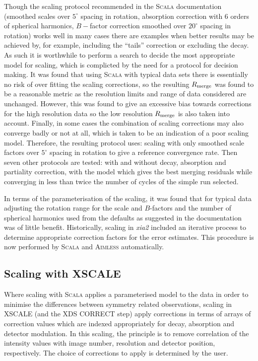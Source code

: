 \documentclass[preprint,pdf]{iucr}
\begin{document}
Though the scaling protocol recommended in the \textsc{Scala} documentation
(smoothed scales over $5^{\circ}$ spacing in rotation, absorption
correction with 6 orders of spherical harmonics, $B-$factor correction
smoothed over $20^{\circ}$ spacing in rotation) works well in many
cases there are examples when better results may be achieved by,
for example, including the ``tails'' correction or excluding the
decay. As such it is worthwhile to perform a search to decide the most
appropriate model for scaling, which is complicted by the need for a
protocol for decision making. It was found that using \textsc{Scala}
with typical data sets there is essentially no risk of over fitting
the scaling corrections, so the resulting $R_{\rm{merge}}$ was found to
be a reasonable metric as the resolution limits and range of data
considered are unchanged. However, this was found to give an excessive
bias towards corrections for the high resolution data so the low
resolution $R_{\rm{merge}}$ is also taken into account. Finally, in
some cases the combination of scaling corrections may also converge
badly or not at all, which is taken to be an indication of a poor
scaling model. Therefore, 
the resulting protocol uses: scaling with only smoothed scale
factors over $5^{\circ}$ spacing in rotation to give a reference
convergence rate. Then seven other protocols are tested: with and
without decay, absorption and partiality correction, with the model
which gives the best merging residuals while converging in less than
twice the number of cycles of the simple run selected. 

In terms of the parameterisation of the scaling, it was found that for
typical data adjusting the rotation range for the scale and
$B$-factors and the number of spherical harmonics used from the
defaults as suggested in the documentation was of little benefit.
Historically, scaling in \emph{xia2} included an iterative process to
determine appropriate correction factors for the error estimates. This
procedure is now performed by \textsc{Scala} and \textsc{Aimless} automatically.

\subsection{Scaling with XSCALE}

Where scaling with \textsc{Scala} applies a parameterised model to the data
in order to minimise the differences between symmetry related
observations, scaling in XSCALE (and the XDS CORRECT step) apply
corrections in terms of arrays of correction values which are indexed
appropriately for decay, absorption and detector modulation. In this
scaling, the principle is to remove correlation of the intensity values
with image number, resolution and detector position, 
respectively. The choice of corrections to apply
is determined by the user.
\end{document}
